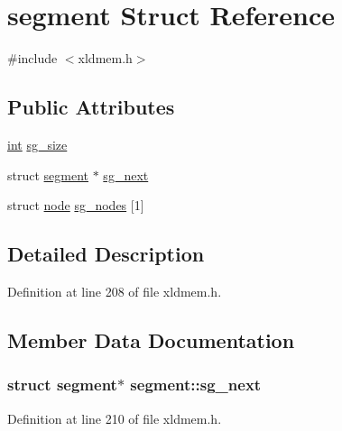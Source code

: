 \hypertarget{structsegment}{}\section{segment Struct Reference}
\label{structsegment}


{\ttfamily \#include $<$xldmem.\+h$>$}

\subsection*{Public Attributes}
\begin{DoxyCompactItemize}
\item 
\hyperlink{xmltok_8h_a5a0d4a5641ce434f1d23533f2b2e6653}{int} \hyperlink{structsegment_aae76e400e607ee28424e82c27b7eadd9}{sg\+\_\+size}
\item 
struct \hyperlink{structsegment}{segment} $\ast$ \hyperlink{structsegment_ae0804cbdb8ab4ec3cfd4dcbf591d3823}{sg\+\_\+next}
\item 
struct \hyperlink{structnode}{node} \hyperlink{structsegment_a66f1b35a18959fb99ef4357b6f949c78}{sg\+\_\+nodes} \mbox{[}1\mbox{]}
\end{DoxyCompactItemize}


\subsection{Detailed Description}


Definition at line 208 of file xldmem.\+h.



\subsection{Member Data Documentation}
\subsubsection[{\texorpdfstring{sg\+\_\+next}{sg_next}}]{\setlength{\rightskip}{0pt plus 5cm}struct {\bf segment}$\ast$ segment\+::sg\+\_\+next}\hypertarget{structsegment_ae0804cbdb8ab4ec3cfd4dcbf591d3823}{}\label{structsegment_ae0804cbdb8ab4ec3cfd4dcbf591d3823}


Definition at line 210 of file xldmem.\+h.

